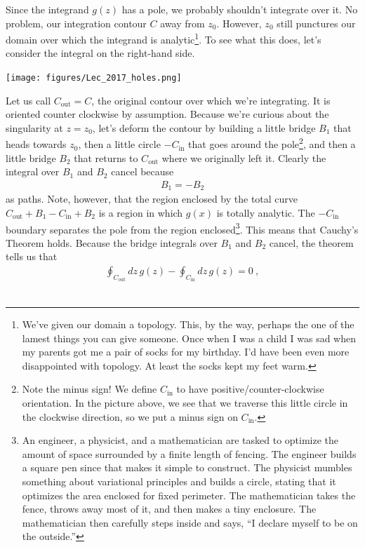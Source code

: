 Since the integrand $g(z)$ has a pole, we probably shouldn't integrate over it. No problem, our integration contour $C$ away from $z_0$. However, $z_0$ still punctures our domain over which the integrand is analytic\footnote{We've given our domain a topology. This, by the way, perhaps the one of the lamest things you can give someone. Once when I was a child I was sad when my parents got me a pair of socks for my birthday. I'd have been even more disappointed with topology. At least the socks kept my feet warm.}. To see what this does, let's consider the integral on the right-hand side.
\begin{center}
\texttt{[image: figures/Lec\_2017\_holes.png]}
\end{center}
Let us call $C_\text{out}=C$, the original contour over which we're integrating. It is oriented counter clockwise by assumption. Because we're curious about the singularity at $z=z_0$, let's deform the contour by building a little bridge $B_1$ that heads towards $z_0$, then a little circle $-C_\text{in}$ that goes around the pole\footnote{Note the minus sign! We define $C_\text{in}$ to have positive/counter-clockwise orientation. In the picture above, we see that we traverse this little circle in the clockwise direction, so we put a minus sign on $C_\text{in}$.}, and then a little bridge $B_2$ that returns to $C_\text{out}$ where we originally left it. Clearly the integral over $B_1$ and $B_2$ cancel because
\begin{align}
	B_1 = -B_2
\end{align}
as paths. Note, however, that the region enclosed by the total curve $C_\text{out} +B_1-C_\text{in}+B_2$ is a region in which $g(x)$ is totally analytic. The $-C_\text{in}$ boundary separates the pole from the region enclosed\footnote{An engineer, a physicist, and a mathematician are tasked to optimize the amount of space surrounded by a finite length of fencing. The engineer builds a square pen since that makes it simple to construct. The physicist mumbles something about variational principles and builds a circle, stating that it optimizes the area enclosed for fixed perimeter. The mathematician takes the fence, throws away most of it, and then makes a tiny enclosure. The mathematician then carefully steps inside and says, ``I declare myself to be on the outside.''}. This means that Cauchy's Theorem holds. Because the bridge integrals over $B_1$ and $B_2$ cancel, the theorem tells us that
\begin{align}
	\oint_{C_\text{out}} dz\, g(z)
	-
	\oint_{C_\text{in}} dz\, g(z)
	= 0 \ ,
\end{align}\
